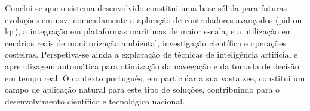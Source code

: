 Conclui-se que o sistema desenvolvido constitui uma base sólida para futuras evoluções em \acrfull{usv}, nomeadamente a aplicação de controladores avançados (\acrfull{pid} ou \acrfull{lqr}), a integração em plataformas marítimas de maior escala, e a utilização em cenários reais de monitorização ambiental, investigação científica e operações costeiras. Perspetiva-se ainda a exploração de técnicas de inteligência artificial e aprendizagem automática para otimização da navegação e da tomada de decisão em tempo real. O contexto português, em particular a sua vasta \acrfull{zee}, constitui um campo de aplicação natural para este tipo de soluções, contribuindo para o desenvolvimento científico e tecnológico nacional.

